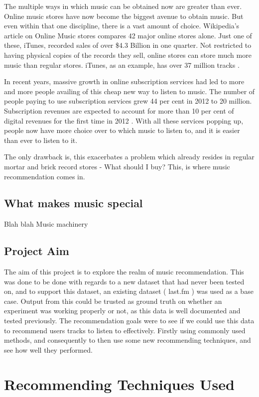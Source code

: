 \documentclass[12pt]{article}
\begin{document}
The multiple ways in which music can be obtained now are greater than ever. Online music stores have now become the biggest avenue to obtain music. But even within that one discipline, there is a vast amount of choice. Wikipedia's article on Online Music stores compares 42 major online stores alone. Just one of these, iTunes, recorded sales of over \$4.3 Billion in one quarter. \cite{itunes} Not restricted to having physical copies of the records they sell, online stores can store much more music than regular stores. iTunes, as an example, has over 37 million tracks \cite{itunesFeatures}. 

In recent years, massive growth in online subscription services had led to more and more people availing of this cheap new way to listen to music. The number of people paying to use subscription services grew 44 per cent in 2012 to 20 million. Subscription revenues are expected to account for more than 10 per cent of digital revenues for the first time in 2012 \cite{ifti}. With all these services popping up, people now have more choice over to which music to listen to, and it is easier than ever to listen to it.

The only drawback is, this exacerbates a problem which already resides in regular mortar and brick record stores - What should I buy? This, is where music recommendation comes in. 
\pagebreak
\subsection{What makes music special}
Blah blah Music machinery 
\subsection{Project Aim}
The aim of this project is to explore the realm of music recommendation. This was done to be done with regards to a new dataset that had never been tested on, and to support this dataset, an existing dataset ( last.fm ) was used as a base case. Output from this could be trusted as ground truth on whether an experiment was working properly or not, as this data is well documented and tested previously. The recommendation goals were to see if we could use this data to recommend users tracks to listen to effectively. Firstly using commonly used methods, and consequently to then use some new recommending techniques, and see how well they performed.
\pagebreak

\section{Recommending Techniques Used}
\end{document}
